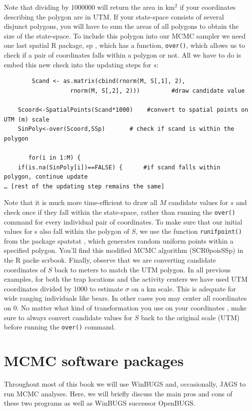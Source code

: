  Note that dividing by 1000000 will return the area in km$^2$ if your coordinates describing the polygon are in UTM. If your state-space consists of several disjunct polygons, you will have to sum the areas of all polygons to obtain the size of the state-space.
To include this polygon into our MCMC sampler we need one last spatial R package, sp \citep{pebesma_bivand:2011}, which has a function, \verb#over()#, which allows us to check if a pair of coordinates falls within a polygon or not. All we have to do is embed this new check into the updating steps for $s$:
\begin{verbatim}
        Scand <- as.matrix(cbind(rnorm(M, S[,1], 2),
                   rnorm(M, S[,2], 2)))	        #draw candidate value

	Scoord<-SpatialPoints(Scand*1000)    #convert to spatial points on UTM (m) scale
	SinPoly<-over(Scoord,SSp)		# check if scand is within the polygon

       for(i in 1:M) {
	if(is.na(SinPoly[i])==FALSE) {		#if scand falls within polygon, continue update
… [rest of the updating step remains the same]
\end{verbatim}
Note that it is much more time-efficient to draw all $M$ candidate values for $s$ and check once if they fall within the state-space, rather than running the \verb#over()# command for every individual pair of coordinates. To make sure that our initial values for s also fall within the polygon of $S$, we use the function \verb#runifpoint()# from the package spatstat \citep{baddeley_turner:2005}, which generates random uniform points within a specified polygon. You'll find this modified MCMC algorithm (SCR0poisSSp) in the R packe scrbook.
Finally, observe that we are converting candidate coordinates of $S$ back to meters to match the UTM polygon. In all previous examples, for both the trap locations and the activity centers we have used UTM coordinates divided by 1000 to estimate $\sigma$ on a km scale. This is adequate for wide ranging individuals like bears. In other cases you may center all coordinates on 0. No matter what kind of transformation you use on your coordinates , make sure to always convert candidate values for $S$ back to the original scale (UTM) before running the \verb#over()# command.

\section{MCMC software packages}
Throughout most of this book we will use WinBUGS and, occasionally, JAGS to run MCMC analyses. Here, we will briefly discuss the main pros and cons of these two programs as well as WinBUGS successor OpenBUGS. 


